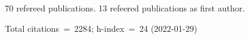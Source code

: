 70 refereed publications. 13 refeered publications as first author.

Total citations~=~2284; h-index~=~24 (2022-01-29)